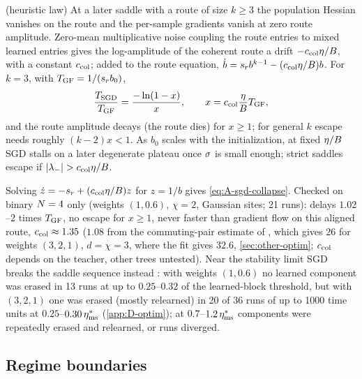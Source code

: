 \begin{proposition}\label{prop:A-sgd-collapse}
  \conjecture{} (heuristic law) 
  At a later saddle with a route of size $k\ge3$ the population Hessian vanishes on the route and the
  per-sample gradients vanish at zero route amplitude. Zero-mean multiplicative noise coupling the route
  entries to mixed learned entries gives the log-amplitude of the coherent route a drift $-c_{\rm col}\eta/B$,
  with a constant $c_{\rm col}$; added to the route equation, $\dot b=s_{r}b^{k-1}-(c_{\rm col}\eta/B)b$. For $k=3$, with
  $T_{\rm GF}=1/(s_{r}b_0)$,
  \begin{equation}\label{eq:A-sgd-collapse}
    \frac{T_{\rm SGD}}{T_{\rm GF}}=\frac{-\ln(1-x)}{x},\qquad x=c_{\rm col}\frac{\eta}{B}T_{\rm GF},
  \end{equation}
  and the route amplitude decays (the route dies) for $x\ge1$; for general $k$ escape needs roughly $(k-2)x<1$. As
  $b_0$ scales with the initialization, at fixed $\eta/B$ SGD stalls on a later degenerate plateau once $\sigma$ is
  small enough; strict saddles escape if $\lvert\lambda_-\rvert>c_{\rm col}\eta/B$.
\end{proposition}
Solving $\dot z=-s_{r}+(c_{\rm col}\eta/B)z$ for $z=1/b$ gives \eqref{eq:A-sgd-collapse}. Checked on binary $N=4$ only (weights
$(1,0.6)$, $\chi=2$, Gaussian sites; 21 runs): delays $1.02$--$2$ times $T_{\rm GF}$, no escape for $x\ge1$, never faster than
gradient flow on this aligned route, $c_{\rm col}\approx1.35$ \empirical{} ($1.08$ from the commuting-pair estimate of
, which gives $26$ for weights $(3,2,1)$, $d=\chi=3$, where the fit gives $32.6$,
\cref{sec:other-optim}; $c_{\rm col}$ depends on the teacher, other trees untested). Near the stability limit SGD
breaks the saddle sequence instead \empirical: with weights $(1,0.6)$ no learned component was erased in 13 runs
at up to $0.25$--$0.32$ of the learned-block threshold, but with $(3,2,1)$ one was erased (mostly relearned) in
20 of 36 runs of up to 1000 time units at $0.25$--$0.30\,\eta^*_{\rm ms}$ (\cref{app:D-optim}); at
$0.7$--$1.2\,\eta^*_{\rm ms}$ components were repeatedly erased and relearned, or runs diverged.

\subsection{Regime boundaries}\label{app:boundaries}

